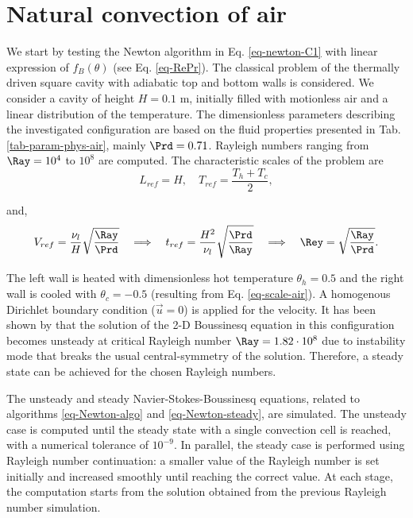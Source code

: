 
\section{Natural convection of air}\label{sec: natconv-air-2D}
We start by testing the Newton algorithm in Eq. \eqref{eq-newton-C1} with linear expression of $f_B(\theta)$  (see Eq. \eqref{eq-RePr}). %
The classical problem of the thermally driven square cavity with adiabatic top and bottom walls is considered.
We consider a cavity of height $H = 0.1$ m, initially filled with motionless air and a linear distribution of the temperature. 
The dimensionless parameters describing the investigated configuration are based on the fluid properties presented in Tab. \ref{tab-param-phys-air}, mainly $\Prd = 0.71$.
Rayleigh numbers ranging from $\Ray = 10^4$ to $10^8$ are computed. 
The characteristic scales of the problem are 
\begin{equation} \label{eq-scale-air}
	L_{ref} = H, \quad T_{ref} = \frac{T_h + T_c}{2},
\end{equation}

\noindent and,
\begin{equation} \label{eq-scaling-3}
   V_{ref} = \frac{\nu_l}{H} \sqrt{\frac{\Ray}{\Prd}} 
   \quad \Longrightarrow \quad t_{ref} = \frac{H^2}{\nu_l} \sqrt{\frac{\Prd}{\Ray}} 
   \quad \Longrightarrow \quad \Rey = \sqrt{\frac{\Ray}{\Prd}}.
\end{equation} 

\noindent The left wall is heated with dimensionless hot temperature $\theta_h = 0.5$ and the right wall is cooled with $\theta_c = -0.5$ (resulting from Eq. \eqref{eq-scale-air}). 
A homogenous Dirichlet boundary condition ($\vec u = 0$) is applied for the velocity.
It has been shown by \cite{le1998onset} that the solution of the 2-D Boussinesq equation in this configuration becomes unsteady at critical Rayleigh number $\Ray= 1.82 \cdot 10^{8}$ due to instability mode that breaks the usual central-symmetry of the solution.
Therefore, a steady state can be achieved for the chosen Rayleigh numbers.

The unsteady  and steady Navier-Stokes-Boussinesq equations, related to algorithms \eqref{eq-Newton-algo} and \eqref{eq-Newton-steady}, are simulated.
The unsteady case is computed until the steady state with a single convection cell is reached, with a numerical tolerance of $10^{-9}$.
In parallel, the steady case is performed using Rayleigh number continuation:
a smaller value of the Rayleigh number is set initially and increased smoothly until reaching the correct value.
At each stage, the computation starts from the solution obtained from the previous Rayleigh number simulation.

